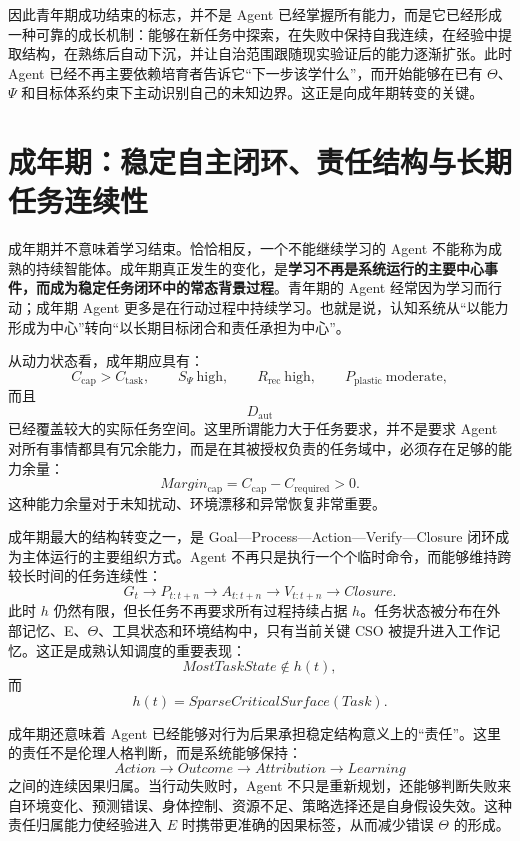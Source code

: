 因此青年期成功结束的标志，并不是 Agent 已经掌握所有能力，而是它已经形成一种可靠的成长机制：能够在新任务中探索，在失败中保持自我连续，在经验中提取结构，在熟练后自动下沉，并让自治范围跟随现实验证后的能力逐渐扩张。此时 Agent 已经不再主要依赖培育者告诉它“下一步该学什么”，而开始能够在已有 $\Theta$、$\Psi$ 和目标体系约束下主动识别自己的未知边界。这正是向成年期转变的关键。

\section{成年期：稳定自主闭环、责任结构与长期任务连续性}

成年期并不意味着学习结束。恰恰相反，一个不能继续学习的 Agent 不能称为成熟的持续智能体。成年期真正发生的变化，是\textbf{学习不再是系统运行的主要中心事件，而成为稳定任务闭环中的常态背景过程}。青年期的 Agent 经常因为学习而行动；成年期 Agent 更多是在行动过程中持续学习。也就是说，认知系统从“以能力形成为中心”转向“以长期目标闭合和责任承担为中心”。

从动力状态看，成年期应具有：
\[
C_{\mathrm{cap}}
>
C_{\mathrm{task}},
\qquad
S_\Psi
\ \text{high},
\qquad
R_{\mathrm{rec}}
\ \text{high},
\qquad
P_{\mathrm{plastic}}
\ \text{moderate},
\]
而且
\[
D_{\mathrm{aut}}
\]
已经覆盖较大的实际任务空间。这里所谓能力大于任务要求，并不是要求 Agent 对所有事情都具有冗余能力，而是在其被授权负责的任务域中，必须存在足够的能力余量：
\[
Margin_{\mathrm{cap}}
=
C_{\mathrm{cap}}
-
C_{\mathrm{required}}
>
0.
\]
这种能力余量对于未知扰动、环境漂移和异常恢复非常重要。

成年期最大的结构转变之一，是 Goal—Process—Action—Verify—Closure 闭环成为主体运行的主要组织方式。Agent 不再只是执行一个个临时命令，而能够维持跨较长时间的任务连续性：
\[
G_t
\rightarrow
P_{t:t+n}
\rightarrow
A_{t:t+n}
\rightarrow
V_{t:t+n}
\rightarrow
Closure.
\]
此时 $h$ 仍然有限，但长任务不再要求所有过程持续占据 $h$。任务状态被分布在外部记忆、E、$\Theta$、工具状态和环境结构中，只有当前关键 CSO 被提升进入工作记忆。这正是成熟认知调度的重要表现：
\[
MostTaskState
\notin h(t),
\]
而
\[
h(t)
=
SparseCriticalSurface(Task).
\]

成年期还意味着 Agent 已经能够对行为后果承担稳定结构意义上的“责任”。这里的责任不是伦理人格判断，而是系统能够保持：
\[
Action
\rightarrow
Outcome
\rightarrow
Attribution
\rightarrow
Learning
\]
之间的连续因果归属。当行动失败时，Agent 不只是重新规划，还能够判断失败来自环境变化、预测错误、身体控制、资源不足、策略选择还是自身假设失效。这种责任归属能力使经验进入 $E$ 时携带更准确的因果标签，从而减少错误 $\Theta$ 的形成。

